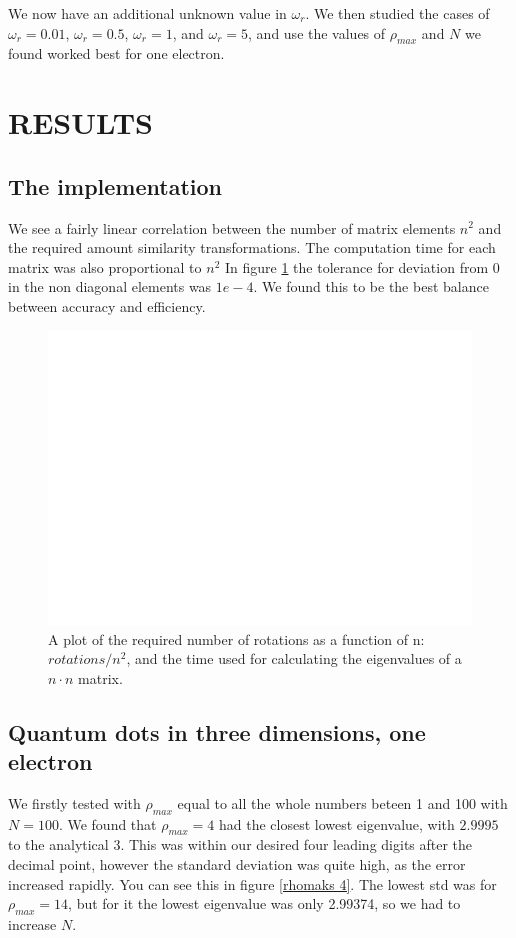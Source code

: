 \documentclass[a4paper]{article}
\begin{document}
We now have an additional unknown value in $\omega_r$. We then studied the cases of $\omega_r = 0.01$, $\omega_r = 0.5$, $\omega_r = 1$, and $\omega_r = 5$, and use the values of $\rho_{max}$ and $N$ we found worked best for one electron.


\section{RESULTS}
\subsection{The implementation}
We see a fairly linear correlation between the number of matrix elements $n^2$ and the required amount similarity transformations. The computation time for each matrix was also proportional to $n^2$ In figure \ref{computation time plot} the tolerance for deviation from 0 in the non diagonal elements was $1e-4$. We found this to be the best balance between accuracy and efficiency. 
\begin{figure}[h!]
	\centering 
	\includegraphics[scale=0.7]{../requiredRotations.pdf}
	\caption{A plot of the required number of rotations as a function of n: $rotations/n^2$, and the time used for calculating the eigenvalues of a $n\cdot n$ matrix.}
	\label{computation time plot}
\end{figure}

\subsection{Quantum dots in three dimensions, one electron}
We firstly tested with $\rho_{max}$ equal to all the whole numbers beteen 1 and 100 with $N=100$. We found that $\rho_{max} = 4$ had the closest lowest eigenvalue, with $2.9995$ to the analytical 3. This was within our desired four leading digits after the decimal point, however the standard deviation was quite high, as the error increased rapidly. You can see this in figure \ref{rhomaks 4}. The lowest std was for $\rho_{max} = 14$, but for it the lowest eigenvalue was only 2.99374, so we had to increase $N$. 
\end{document}

